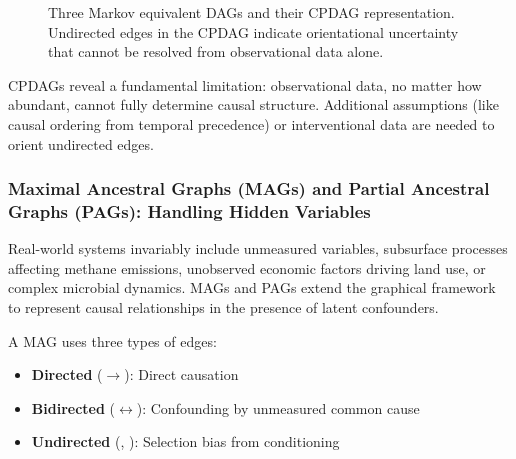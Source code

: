 \begin{figure}[h!]
\centering
{}
\caption{Three Markov equivalent DAGs and their CPDAG representation. Undirected edges in the CPDAG indicate orientational uncertainty that cannot be resolved from observational data alone.}
\label{fig:cpdag_example}
\end{figure}

CPDAGs reveal a fundamental limitation: observational data, no matter how abundant, cannot fully determine causal structure. Additional assumptions (like causal ordering from temporal precedence) or interventional data are needed to orient undirected edges.

\subsubsection{Maximal Ancestral Graphs (MAGs) and Partial Ancestral Graphs (PAGs): Handling Hidden Variables}

Real-world systems invariably include unmeasured variables, subsurface processes affecting methane emissions, unobserved economic factors driving land use, or complex microbial dynamics. MAGs and PAGs extend the graphical framework to represent causal relationships in the presence of latent confounders.

A MAG uses three types of edges:
\begin{itemize}
\item \textbf{Directed} ($\rightarrow$): Direct causation
\item \textbf{Bidirected} ($\leftrightarrow$): Confounding by unmeasured common cause
\item \textbf{Undirected} (, ): Selection bias from conditioning
\end{itemize}

